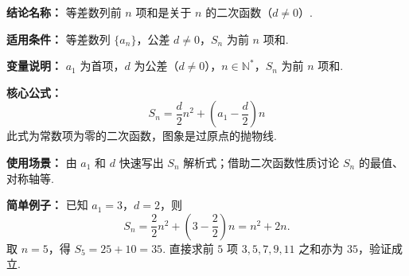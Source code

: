 \textbf{结论名称：} 等差数列前 \(n\) 项和是关于 \(n\) 的二次函数（\(d \neq 0\)）.

\textbf{适用条件：} 等差数列 \(\{a_n\}\)，公差 \(d \neq 0\)，\(S_n\) 为前 \(n\) 项和.

\textbf{变量说明：} \(a_1\) 为首项，\(d\) 为公差（\(d \neq 0\)），\(n \in \mathbb{N}^*\)，\(S_n\) 为前 \(n\) 项和.

\textbf{核心公式：}
\[
\boxed{S_n = \frac{d}{2}n^2 + \left(a_1 - \frac{d}{2}\right)n}
\]
此式为常数项为零的二次函数，图象是过原点的抛物线.

\textbf{使用场景：} 由 \(a_1\) 和 \(d\) 快速写出 \(S_n\) 解析式；借助二次函数性质讨论 \(S_n\) 的最值、对称轴等.

\textbf{简单例子：} 已知 \(a_1 = 3\)，\(d = 2\)，则
\[
S_n = \frac{2}{2}n^2 + \left(3 - \frac{2}{2}\right)n = n^2 + 2n .
\]
取 \(n=5\)，得 \(S_5 = 25 + 10 = 35\). 直接求前 \(5\) 项 \(3,5,7,9,11\) 之和亦为 \(35\)，验证成立.